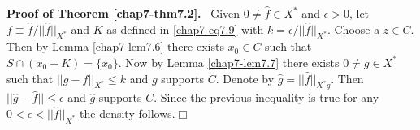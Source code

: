 \noindent
{\bf Proof of Theorem \ref{chap7-thm7.2}.}~ Given $0\neq
\hat{f}\in X^{*}$ and $\epsilon>0$, let $f\equiv
\hat{f}/||\hat{f}||_{X^{*}}$ and $K$ as defined in
\eqref{chap7-eq7.9} with $k=\epsilon/||\hat{f}||_{X^{*}}$. Choose
a $z\in C$. Then by Lemma \ref{chap7-lem7.6} there exists $x_{0}\in C$
such that $S\cap (x_{0}+K)=\{x_{0}\}$. Now by Lemma \ref{chap7-lem7.7}
there exists $0\neq g\in X^{*}$ such that $||g-f||_{X^{*}}\leq k$ and
$g$ supports $C$. Denote by
$\hat{g}=||\hat{f}||_{X^{*}g}$. Then
$||\hat{g}-\hat{f}||\leq \epsilon$ and $\hat{g}$ supports
$C$. Since the previous inequality is true for any
$0<\epsilon<||\hat{f}||_{X^{*}}$ the density follows.\hfill$\Box$ 

